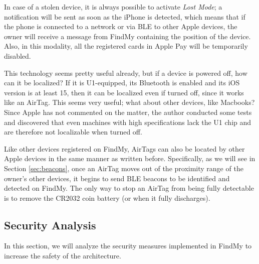 \documentclass[english]{article}
\begin{document}
In case of a stolen device, it is always possible to activate \textit{Lost Mode}; a notification will be sent as soon as the iPhone is detected, which means that if the phone is connected to a network or via BLE to other Apple devices, the owner will receive a message from FindMy containing the position of the device. Also, in this modality, all the registered cards in Apple Pay will be temporarily disabled.

This technology seems pretty useful already, but if a device is powered off, how can it be localized? If it is U1-equipped, its Bluetooth is enabled and its iOS version is at least 15, then it can be localized even if turned off, since it works like an AirTag. This seems very useful; what about other devices, like Macbooks? Since Apple has not commented on the matter, the author conducted some tests and discovered that even machines with high specifications lack the U1 chip and are therefore not localizable when turned off. 

Like other devices registered on FindMy, AirTags can also be located by other Apple devices in the same manner as written before. Specifically, as we will see in Section \ref{sec:beacons}, once an AirTag moves out of the proximity range of the owner's other devices, it begins to send BLE beacons to be identified and detected on FindMy. The only way to stop an AirTag from being fully detectable is to remove the CR2032 coin battery (or when it fully discharges).

\subsection{Security Analysis}
In this section, we will analyze the security measures implemented in FindMy to increase the safety of the architecture.
\end{document}
